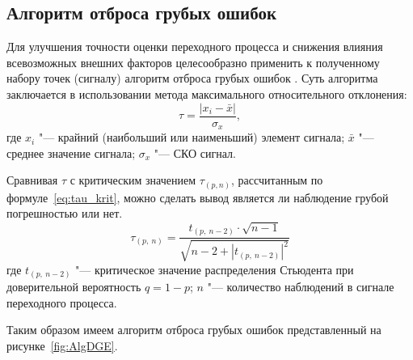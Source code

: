 	\subsection{Алгоритм отброса грубых ошибок}
	
	Для улучшения точности оценки переходного процесса и снижения влияния всевозможных внешних факторов целесообразно применить к полученному набору точек (сигналу) алгоритм отброса грубых ошибок \cite{LvovStat}.
	Суть алгоритма заключается в использовании метода максимального относительного отклонения:
	\begin{equation}\label{eq:MOO}
		\tau=\frac{|x_i-\bar{x}|}{\sigma_x},
	\end{equation} 
	где $ x_i $ "--- крайний (наибольший или наименьший) элемент сигнала; $ \bar{x} $ "--- среднее значение сигнала; $ \sigma_x $ "--- СКО сигнал.

	Сравнивая $ \tau $ с критическим значением $ \tau_{(p,n)} $, рассчитанным по формуле~\ref{eq:tau_krit}, можно сделать вывод является ли наблюдение грубой погрешностью или нет.
	\begin{equation}\label{eq:tau_krit}
		\tau_{(p,\ n)}=\frac{t_{(p,\ n-2)}\cdot\sqrt{n-1}}{\sqrt{n-2+|t_{(p,\ n-2)}|^2}}
	\end{equation}
	где $ t_{(p,\ n-2)} $ "--- критическое значение распределения Стьюдента при доверительной вероятность $ q=1-p $; $ n $ "--- количество наблюдений в сигнале переходного процесса.


	Таким образом имеем алгоритм отброса грубых ошибок представленный на рисунке~\ref{fig:AlgDGE}.

